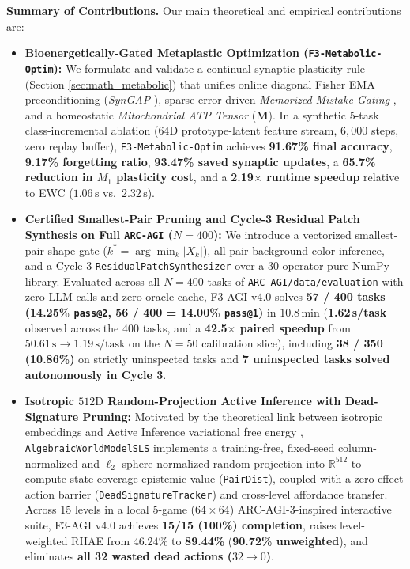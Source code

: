 \documentclass[10pt,a4paper]{article}
\begin{document}
\textbf{Summary of Contributions.} Our main theoretical and empirical contributions are:
\begin{itemize}
    \item \textbf{Bioenergetically-Gated Metaplastic Optimization (\texttt{F3-Metabolic-Optim}):} We formulate and validate a continual synaptic plasticity rule (Section \ref{sec:math_metabolic}) that unifies online diagonal Fisher EMA preconditioning (\emph{SynGAP} \cite{zainal2024syngap}), sparse error-driven \emph{Memorized Mistake Gating} \cite{vanrossum2025mistake}, and a homeostatic \emph{Mitochondrial ATP Tensor} ($\mathbf{M}$). In a synthetic 5-task class-incremental ablation ($64\text{D}$ prototype-latent feature stream, $6,000$ steps, zero replay buffer), \texttt{F3-Metabolic-Optim} achieves \textbf{91.67\% final accuracy}, \textbf{9.17\% forgetting ratio}, \textbf{93.47\% saved synaptic updates}, a \textbf{65.7\% reduction in $M_1$ plasticity cost}, and a \textbf{2.19$\times$ runtime speedup} relative to EWC ($1.06\,\text{s}$ vs.\ $2.32\,\text{s}$).
    \item \textbf{Certified Smallest-Pair Pruning and Cycle-3 Residual Patch Synthesis on Full \texttt{ARC-AGI} ($N=400$):} We introduce a vectorized smallest-pair shape gate ($k^* = \arg\min_k |X_k|$), all-pair background color inference, and a Cycle-3 \texttt{ResidualPatchSynthesizer} over a 30-operator pure-NumPy library. Evaluated across all $N=400$ tasks of \texttt{ARC-AGI/data/evaluation} with zero LLM calls and zero oracle cache, F3-AGI v4.0 solves \textbf{57 / 400 tasks (14.25\% \texttt{pass@2}, 56 / 400 = 14.00\% \texttt{pass@1})} in $10.8\,\text{min}$ (\textbf{1.62\,s/task} observed across the 400 tasks, and a \textbf{42.5$\times$ paired speedup} from $50.61\,\text{s} \to 1.19\,\text{s/task}$ on the $N=50$ calibration slice), including \textbf{38 / 350 (10.86\%)} on strictly uninspected tasks and \textbf{7 uninspected tasks solved autonomously in Cycle 3}.
    \item \textbf{Isotropic $512\text{D}$ Random-Projection Active Inference with Dead-Signature Pruning:} Motivated by the theoretical link between isotropic embeddings and Active Inference variational free energy \cite{balestriero2025lejepa,arnez2026sigreg}, \texttt{AlgebraicWorldModelSLS} implements a training-free, fixed-seed column-normalized and $\ell_2$-sphere-normalized random projection into $\mathbb{R}^{512}$ to compute state-coverage epistemic value (\texttt{PairDist}), coupled with a zero-effect action barrier (\texttt{DeadSignatureTracker}) and cross-level affordance transfer. Across 15 levels in a local 5-game ($64\times 64$) ARC-AGI-3-inspired interactive suite, F3-AGI v4.0 achieves \textbf{15/15 (100\%) completion}, raises level-weighted RHAE from $46.24\%$ to \textbf{89.44\%} (\textbf{90.72\% unweighted}), and eliminates \textbf{all 32 wasted dead actions ($32 \to 0$)}.
\end{itemize}
\end{document}
